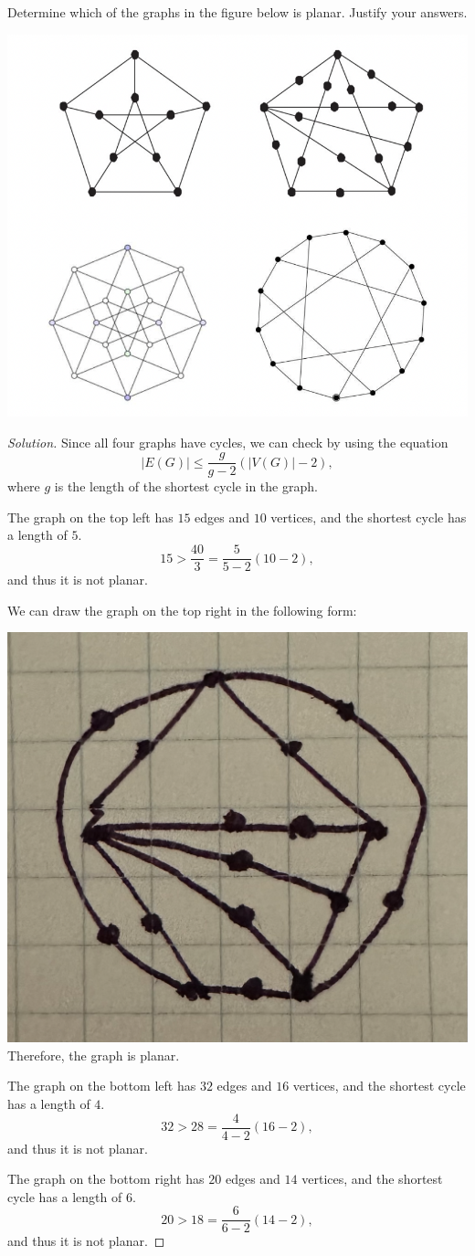 \documentclass{article}
\newenvironment{problem}[2][Problem]{\begin{trivlist}
\item[\hskip \labelsep {\bfseries #1}\hskip \labelsep {\bfseries #2.}]}{\end{trivlist}}
\begin{document}
\begin{problem}{4.7.5}
    Determine which of the graphs in the figure below is planar. Justify your answers.
    
    \includegraphics[width=.87\textwidth]{Q475}
\end{problem}

\begin{proof}[Solution]
    Since all four graphs have cycles, we can check by using the equation
    \[
        |E(G)| \leq \frac{g}{g - 2}(|V(G)| - 2),
    \]
    where $g$ is the length of the shortest cycle in the graph. 
    
    The graph on the top left has $15$ edges and $10$ vertices, and the shortest cycle has a length of $5$.
    \[
        15 > \frac{40}{3} = \frac{5}{5 - 2}(10 - 2),
    \]
    and thus it is not planar. 
    
    We can draw the graph on the top right in the following form:
    
    \includegraphics[width=.25\textwidth]{Q475-2} \\
    Therefore, the graph is planar.

    The graph on the bottom left has $32$ edges and $16$ vertices, and the shortest cycle has a length of $4$.
    \[
        32 > 28 = \frac{4}{4 - 2}(16 - 2),
    \]
    and thus it is not planar. 

    The graph on the bottom right has $20$ edges and $14$ vertices, and the shortest cycle has a length of $6$.
    \[
        20 > 18 = \frac{6}{6 - 2}(14 - 2),
    \]
    and thus it is not planar. 
\end{proof}
\end{document}
